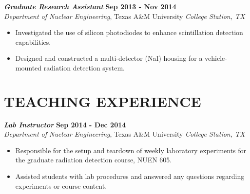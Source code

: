 \documentclass[margin, 10pt]{style/res} %
\begin{document}
\begin{resume}
{\sl\bf Graduate Research Assistant} \hfill {\bf Sep 2013 - Nov 2014} \\
{\sl Department of Nuclear Engineering}, Texas A\&M University \hfill {\sl College Station, TX} %
\vspace{2pt}
\begin{itemize}[leftmargin=4ex] \itemsep -2pt
\item Investigated the use of silicon photodiodes to enhance scintillation detection capabilities.
\item Designed and constructed a multi-detector (NaI) housing for a vehicle-mounted radiation detection system.
\end{itemize} 





 
\section{\small{TEACHING EXPERIENCE}}

{\sl\bf Lab Instructor} \hfill {\bf Sep 2014 - Dec 2014} \\
{\sl Department of Nuclear Engineering}, Texas A\&M University \hfill {\sl College Station, TX}
\vspace{2pt}
\begin{itemize}[leftmargin=4ex] \itemsep -2pt
\item Responsible for the setup and teardown of weekly laboratory experiments for the graduate radiation detection course, NUEN 605.
\item Assisted students with lab procedures and answered any questions regarding experiments or course content.
\end{itemize} 


\end{resume}
\end{document}
